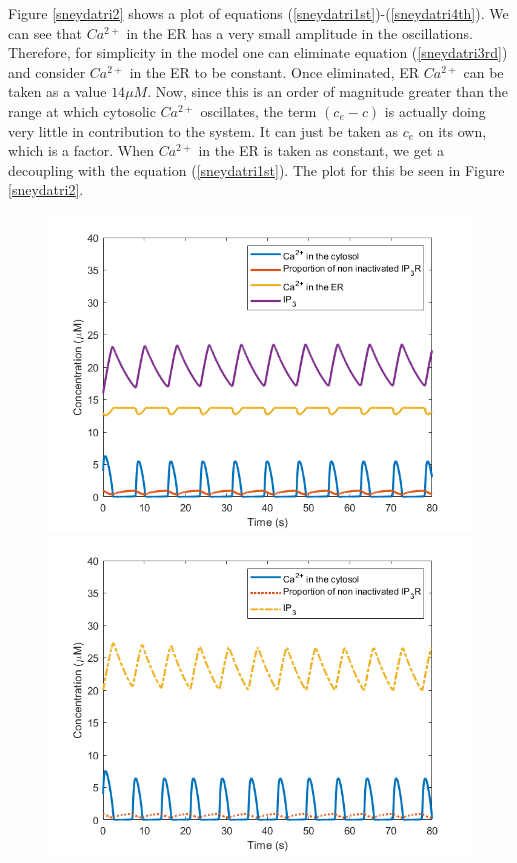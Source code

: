 Figure \ref{sneydatri2} shows a plot of equations (\ref{sneydatri1st})-(\ref{sneydatri4th}). We can see that $Ca^{2+}$ in the ER has a very small amplitude in the oscillations. Therefore, for simplicity in the model one can eliminate equation (\ref{sneydatri3rd}) and consider $Ca^{2+}$ in the ER to be constant. Once eliminated, ER $Ca^{2+}$ can be taken as a value $14 \mu M$. Now, since this is an order of magnitude greater than the range at which cytosolic $Ca^{2+}$ oscillates, the term $(c_e-c)$ is actually doing very little in contribution to the system. It can just be taken as $c_e$ on its own, which is a factor. When $Ca^{2+}$ in the ER is taken as constant, we get a decoupling with the equation (\ref{sneydatri1st}). The plot for this be seen in Figure \ref{sneydatri2}. 

\begin{figure}[!htb]
\centering
{}
  \includegraphics[width=\linewidth]{Chapters/7_appendix_A/extras/sneydatri2.png}
\endminipage\hfill\\
  \includegraphics[width=\linewidth]{Chapters/7_appendix_A/extras/sneydatri2NOER.png}

\end{figure}
